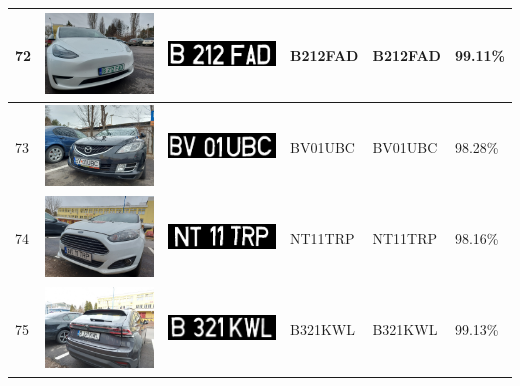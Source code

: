 \documentclass[a4paper,12pt]{report}
\begin{document}
\begin{longtable}{| m{0.6cm} | m{3cm} | m{3cm} | m{1.8cm} | m{1.8cm} | m{1.8cm} |}
    72  & \includegraphics[width=3cm,keepaspectratio]{dataset/40_s1.jpg}  & \includegraphics[width=3cm,keepaspectratio]{segmentari/72.jpg}  & B212FAD             & B212FAD              & 99.11\%    \\ \hline
    73  & \includegraphics[width=3cm,keepaspectratio]{dataset/41_d1.jpg}  & \includegraphics[width=3cm,keepaspectratio]{segmentari/73.jpg}  & BV01UBC             & BV01UBC              & 98.28\%    \\ \hline
    74  & \includegraphics[width=3cm,keepaspectratio]{dataset/42_d1.jpg}  & \includegraphics[width=3cm,keepaspectratio]{segmentari/74.jpg}  & NT11TRP             & NT11TRP              & 98.16\%    \\ \hline
    75  & \includegraphics[width=3cm,keepaspectratio]{dataset/43_d1.jpg}  & \includegraphics[width=3cm,keepaspectratio]{segmentari/75.jpg}  & B321KWL             & B321KWL              & 99.13\%    \\ \hline

\end{longtable}
\end{document}
